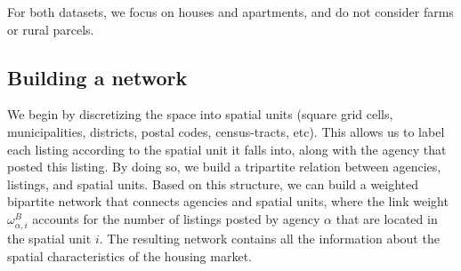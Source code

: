 For both datasets, we focus on houses and apartments, and do not consider farms or rural parcels.

\subsection{Building a network}

We begin by discretizing the space into spatial units (square grid cells, municipalities, districts, postal codes, census-tracts, etc).
This allows us to label each listing according to the spatial unit it falls into, along with the agency that posted this listing. By doing so, we build a tripartite relation between agencies, listings, and spatial units. Based on this structure, we can build a weighted bipartite network that connects agencies and spatial units, where the link weight $\omega^{B}_{\alpha,i}$ accounts for the number of listings posted by agency $\alpha$ that are located in the spatial unit $i$. The resulting network contains all the information about the spatial characteristics of the housing market. 

